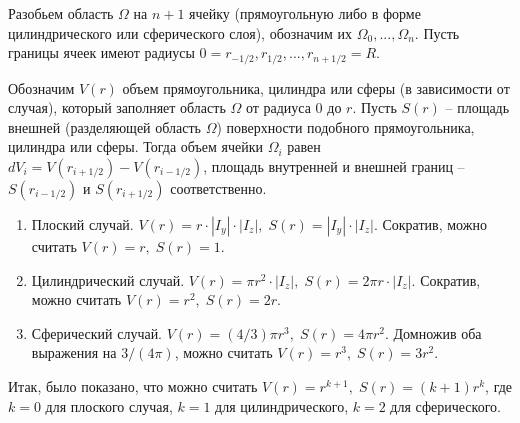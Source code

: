 Разобьем область $\Omega$ на $n + 1$ ячейку (прямоугольную либо в форме цилиндрического или сферического слоя), обозначим их $\Omega_0, ..., \Omega_n$. Пусть границы ячеек имеют радиусы $0 = r_{-1/2}, r_{1/2}, ..., r_{n + 1/2} = R$.

Обозначим $V(r)$ объем прямоугольника, цилиндра или сферы (в зависимости от случая), который заполняет область $\Omega$ от радиуса $0$ до $r$. Пусть $S(r)$ -- площадь внешней (разделяющей область $\Omega$) поверхности подобного прямоугольника, цилиндра или сферы. Тогда объем ячейки $\Omega_i$ равен $dV_i = V(r_{i + 1/2}) - V(r_{i - 1/2})$, площадь внутренней и внешней границ -- $S(r_{i - 1/2})$ и $S(r_{i + 1/2})$ соответственно.

\begin{enumerate}[label=\arabic*.]
    \item Плоский случай. $V(r) = r \cdot |I_y| \cdot |I_z|, \; S(r) = |I_y| \cdot |I_z|$. Сократив, можно считать $V(r) = r, \; S(r) = 1$.
    \item Цилиндрический случай. $V(r) = \pi r^2 \cdot |I_z|, \; S(r) = 2 \pi r \cdot |I_z|$. Сократив, можно считать $V(r) = r^2, \; S(r) = 2r$.
    \item Сферический случай. $V(r) = (4/3) \pi r^3, \; S(r) = 4 \pi r^2$. Домножив оба выражения на $3/(4\pi)$, можно считать $V(r) = r^3, \; S(r) = 3 r^2$.
\end{enumerate}

Итак, было показано, что можно считать $V(r) = r^{k + 1}, \; S(r) = (k + 1)r^k$, где $k = 0$ для плоского случая, $k = 1$ для цилиндрического, $k = 2$ для сферического.

